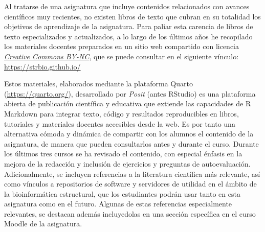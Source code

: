 \documentclass[
  11pt,
  a4paper,
  twoside]{scrreprt}
\begin{document}
Al tratarse de una asignatura que incluye contenidos relacionados con
avances científicos muy recientes, no existen libros de texto que cubran
en su totalidad los objetivos de aprendizaje de la asignatura. Para
paliar esta carencia de libros de texto especializados y actualizados, a
lo largo de los últimos años he recopilado los materiales docentes
preparados en un sitio web compartido con licencia
\href{https://creativecommons.org/licenses/by-nc/2.0/deed.es}{\emph{Creative
Commons BY-NC}}, que se puede consultar en el siguiente vínculo:
\url{https://strbio.github.io/}

Estos materiales, elaborados mediante la plataforma Quarto
(\url{https://quarto.org/}), desarrollado por \emph{Posit} (antes
RStudio) es una plataforma abierta de publicación científica y educativa
que extiende las capacidades de R Markdown para integrar texto, código y
resultados reproducibles en libros, tutoriales y materiales docentes
accesibles desde la web. Es por tanto una alternativa cómoda y dinámica
de compartir con los alumnos el contenido de la asignatura, de manera
que pueden consultarlos antes y durante el curso. Durante los últimos
tres cursos se ha revisado el contenido, con especial énfasis en la
mejora de la redacción y inclusión de ejercicios y preguntas de
autoevaluación. Adicionalmente, se incluyen referencias a la literatura
científica más relevante, así como vínculos a repositorios de software y
servidores de utilidad en el ámbito de la bioinformática estructural,
que los estudiantes podrán usar tanto en esta asignatura como en el
futuro. Algunas de estas referencias especialmente relevantes, se
destacan además incluyedolas en una sección específica en el curso
Moodle de la asignatura.
\end{document}
